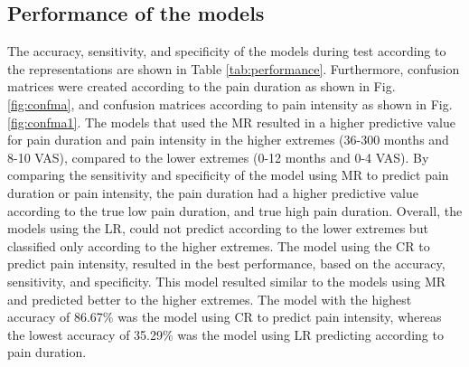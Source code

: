 \subsection{Performance of the models}
The accuracy, sensitivity, and specificity of the models during test according to the representations are shown in Table \ref{tab:performance}. Furthermore, confusion matrices were created according to the pain duration as shown in Fig. \ref{fig:confma}, and confusion matrices according to pain intensity as shown in Fig. \ref{fig:confma1}.
The models that used the MR resulted in a higher predictive value for pain duration and pain intensity in the higher extremes (36-300 months and 8-10 VAS), compared to the lower extremes (0-12 months and 0-4 VAS). By comparing the sensitivity and specificity of the model using MR to predict pain duration or pain intensity, the pain duration had a higher predictive value according to the true low pain duration, and true high pain duration.
Overall, the models using the LR, could not predict according to the lower extremes but classified only according to the higher extremes.  
The model using the CR to predict pain intensity, resulted in the best performance, based on the accuracy, sensitivity, and specificity. This model resulted similar to the models using MR and predicted better to the higher extremes. 
The model with the highest accuracy of 86.67\% was the model using CR to predict pain intensity, whereas the lowest accuracy of 35.29\% was the model using LR predicting according to pain duration. 